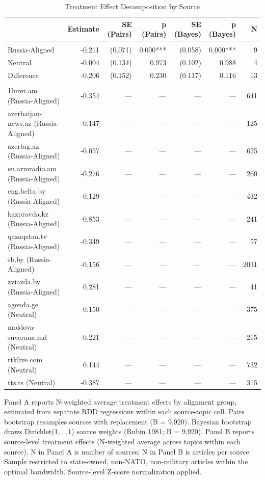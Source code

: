 \begin{table}[t]
\caption{\label{tab:s11minireg}Treatment Effect Decomposition by Source}
\fontsize{12.0pt}{14.0pt}\selectfont
\begin{tabular*}{\linewidth}{@{\extracolsep{\fill}}lrrrrrr}
\toprule
 & Estimate & SE (Pairs) & p (Pairs) & SE (Bayes) & p (Bayes) & N \\ 
\midrule\addlinespace[2.5pt]
\multicolumn{7}{l}{Panel A: Group-Level Effects} \\[2.5pt] 
\midrule\addlinespace[2.5pt]
Russia-Aligned & -0.211 & (0.071) & 0.000*** & (0.058) & 0.000*** & 9 \\ 
Neutral & -0.004 & (0.134) & 0.973 & (0.102) & 0.988 & 4 \\ 
Difference & -0.206 & (0.152) & 0.230 & (0.117) & 0.116 & 13 \\ 
\midrule\addlinespace[2.5pt]
\multicolumn{7}{l}{Panel B: Source-Level Effects} \\[2.5pt] 
\midrule\addlinespace[2.5pt]
1lurer.am (Russia-Aligned) & -0.354 & — & — & — & — & 641 \\ 
azerbaijan-news.az (Russia-Aligned) & -0.147 & — & — & — & — & 125 \\ 
azertag.az (Russia-Aligned) & -0.057 & — & — & — & — & 625 \\ 
en.armradio.am (Russia-Aligned) & -0.276 & — & — & — & — & 260 \\ 
eng.belta.by (Russia-Aligned) & -0.129 & — & — & — & — & 432 \\ 
kazpravda.kz (Russia-Aligned) & -0.853 & — & — & — & — & 241 \\ 
qazaqstan.tv (Russia-Aligned) & -0.349 & — & — & — & — & 57 \\ 
sb.by (Russia-Aligned) & -0.156 & — & — & — & — & 2031 \\ 
zviazda.by (Russia-Aligned) & 0.281 & — & — & — & — & 41 \\ 
agenda.ge (Neutral) & 0.150 & — & — & — & — & 375 \\ 
moldova-suverana.md (Neutral) & -0.221 & — & — & — & — & 215 \\ 
rtklive.com (Neutral) & 0.144 & — & — & — & — & 732 \\ 
rts.rs (Neutral) & -0.387 & — & — & — & — & 315 \\ 
\bottomrule
\end{tabular*}
\begin{minipage}{\linewidth}
\vspace{.05em}
Panel A reports N-weighted average treatment effects by alignment group,
estimated from separate RDD regressions within each source-topic cell. Pairs
bootstrap resamples sources with replacement (B = 9,920). Bayesian bootstrap
draws Dirichlet(1,...,1) source weights (Rubin 1981; B = 9,920). Panel B reports
source-level treatment effects (N-weighted average across topics within each
source). N in Panel A is number of sources; N in Panel B is articles per source.
Sample restricted to state-owned, non-NATO, non-military articles within the
optimal bandwidth. Source-level Z-score normalization applied.\\
\end{minipage}
\end{table}


